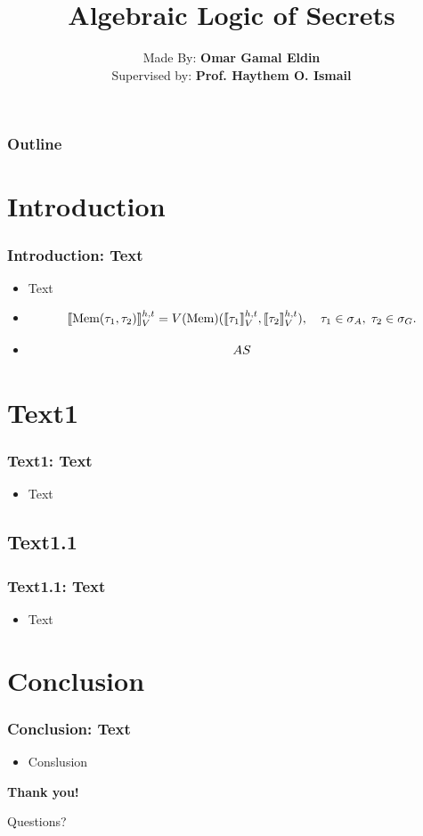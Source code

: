 \documentclass[aspectratio=169]{beamer}
\title{\Huge \textbf{Algebraic Logic of Secrets}}
\author{Made By: \textbf{Omar Gamal Eldin}\\Supervised by: \textbf{Prof. Haythem O. Ismail}}
\institute{}
\date{}
\let\mathcal\relax
\let\mathfrak\relax
\begin{document}
\frame{\titlepage}


\begin{frame}
\frametitle{Outline}
\small
\tableofcontents
\end{frame}


\section{Introduction}

\begin{frame}
\frametitle{Introduction: Text}
\begin{itemize}
    \item Text
    \item {\thesisserif
      \[
        \llbracket \text{Mem}(\tau_1, \tau_2) \rrbracket_{\mathcal{V}}^{h,t}
        = \mathcal{V}(\text{Mem})
        (\llbracket \tau_1 \rrbracket_{\mathcal{V}}^{h,t}, 
        \llbracket \tau_2 \rrbracket_{\mathcal{V}}^{h,t}),
        \quad \tau_1 \in \sigma_A, \; \tau_2 \in \sigma_G.
      \]
    }
    \item \[\mathfrak{AS}\]
\end{itemize}
\end{frame}


\section{Text1}
\begin{frame}
\frametitle{Text1: Text}
\begin{itemize}
    \item Text
\end{itemize}
\end{frame}

\subsection{Text1.1}

\begin{frame}
\frametitle{Text1.1: Text}
\begin{itemize}
    \item Text
\end{itemize}
\end{frame}



\section{Conclusion}

\begin{frame}
\frametitle{Conclusion: Text}
\begin{itemize}
    \item Conslusion
\end{itemize}
\end{frame}


\begin{frame}[c]
\centering
\Huge
\textbf{Thank you!}

\vspace{1cm}

\LARGE
Questions?
\end{frame}
\end{document}
